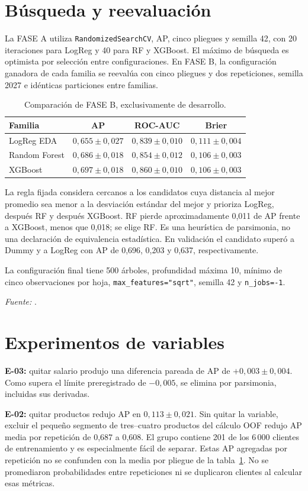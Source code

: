 \documentclass[11pt,a4paper,oneside]{report}
\newcommand{\fuente}[1]{\par{\footnotesize\textit{Fuente:} \path{#1}.}\par}
\begin{document}
\section{Búsqueda y reevaluación}
La FASE A utiliza \texttt{RandomizedSearchCV}, AP, cinco pliegues y semilla 42,
con 20 iteraciones para LogReg y 40 para RF y XGBoost. El máximo de búsqueda
es optimista por selección entre configuraciones. En FASE B, la configuración
ganadora de cada familia se reevalúa con cinco pliegues y dos repeticiones,
semilla 2027 e idénticas particiones entre familias.

\begin{table}[htbp]\centering\small
\caption{Comparación de FASE B, exclusivamente de desarrollo.}\label{tab:faseb}
\begin{tabular}{@{}lccc@{}}\toprule
Familia & AP & ROC-AUC & Brier \\\midrule
LogReg EDA & $0{,}655\pm0{,}027$ & $0{,}839\pm0{,}010$ & $0{,}111\pm0{,}004$ \\
Random Forest & $0{,}686\pm0{,}018$ & $0{,}854\pm0{,}012$ & $0{,}106\pm0{,}003$ \\
XGBoost & $0{,}697\pm0{,}018$ & $0{,}860\pm0{,}010$ & $0{,}106\pm0{,}003$ \\\bottomrule
\end{tabular}
\end{table}

La regla fijada considera cercanos a los candidatos cuya distancia al mejor
promedio sea menor a la desviación estándar del mejor y prioriza LogReg,
después RF y después XGBoost. RF pierde aproximadamente 0,011 de AP frente
a XGBoost, menos que 0,018; se elige RF. Es una heurística de parsimonia,
no una declaración de equivalencia estadística. En validación el candidato
superó a Dummy y a LogReg con AP de 0,696, 0,203 y 0,637, respectivamente.

La configuración final tiene 500 árboles, profundidad máxima 10, mínimo
de cinco observaciones por hoja, \texttt{max\_features="sqrt"}, semilla 42
y \texttt{n\_jobs=-1}.
\fuente{reports/model_selection.md}

\section{Experimentos de variables}
\textbf{E-03:} quitar salario produjo una diferencia pareada de AP de
$+0{,}003\pm0{,}004$. Como supera el límite preregistrado de $-0{,}005$,
se elimina por parsimonia, incluidas sus derivadas.

\textbf{E-02:} quitar productos redujo AP en $0{,}113\pm0{,}021$. Sin quitar
la variable, excluir el pequeño segmento de tres--cuatro productos del cálculo
OOF redujo AP media por repetición de 0,687 a 0,608. El grupo contiene 201 de
los 6\,000 clientes de entrenamiento y es especialmente fácil de separar.
Estas AP agregadas por repetición no se confunden con la media por pliegue
de la tabla~\ref{tab:faseb}. No se promediaron probabilidades entre repeticiones
ni se duplicaron clientes al calcular esas métricas.
\end{document}
